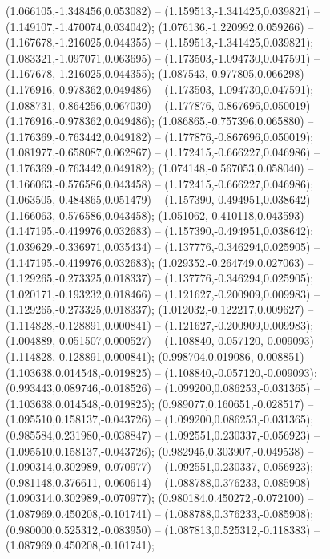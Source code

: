  (1.066105,-1.348456,0.053082) -- (1.159513,-1.341425,0.039821) -- (1.149107,-1.470074,0.034042);
 (1.076136,-1.220992,0.059266) -- (1.167678,-1.216025,0.044355) -- (1.159513,-1.341425,0.039821);
 (1.083321,-1.097071,0.063695) -- (1.173503,-1.094730,0.047591) -- (1.167678,-1.216025,0.044355);
 (1.087543,-0.977805,0.066298) -- (1.176916,-0.978362,0.049486) -- (1.173503,-1.094730,0.047591);
 (1.088731,-0.864256,0.067030) -- (1.177876,-0.867696,0.050019) -- (1.176916,-0.978362,0.049486);
 (1.086865,-0.757396,0.065880) -- (1.176369,-0.763442,0.049182) -- (1.177876,-0.867696,0.050019);
 (1.081977,-0.658087,0.062867) -- (1.172415,-0.666227,0.046986) -- (1.176369,-0.763442,0.049182);
 (1.074148,-0.567053,0.058040) -- (1.166063,-0.576586,0.043458) -- (1.172415,-0.666227,0.046986);
 (1.063505,-0.484865,0.051479) -- (1.157390,-0.494951,0.038642) -- (1.166063,-0.576586,0.043458);
 (1.051062,-0.410118,0.043593) -- (1.147195,-0.419976,0.032683) -- (1.157390,-0.494951,0.038642);
 (1.039629,-0.336971,0.035434) -- (1.137776,-0.346294,0.025905) -- (1.147195,-0.419976,0.032683);
 (1.029352,-0.264749,0.027063) -- (1.129265,-0.273325,0.018337) -- (1.137776,-0.346294,0.025905);
 (1.020171,-0.193232,0.018466) -- (1.121627,-0.200909,0.009983) -- (1.129265,-0.273325,0.018337);
 (1.012032,-0.122217,0.009627) -- (1.114828,-0.128891,0.000841) -- (1.121627,-0.200909,0.009983);
 (1.004889,-0.051507,0.000527) -- (1.108840,-0.057120,-0.009093) -- (1.114828,-0.128891,0.000841);
 (0.998704,0.019086,-0.008851) -- (1.103638,0.014548,-0.019825) -- (1.108840,-0.057120,-0.009093);
 (0.993443,0.089746,-0.018526) -- (1.099200,0.086253,-0.031365) -- (1.103638,0.014548,-0.019825);
 (0.989077,0.160651,-0.028517) -- (1.095510,0.158137,-0.043726) -- (1.099200,0.086253,-0.031365);
 (0.985584,0.231980,-0.038847) -- (1.092551,0.230337,-0.056923) -- (1.095510,0.158137,-0.043726);
 (0.982945,0.303907,-0.049538) -- (1.090314,0.302989,-0.070977) -- (1.092551,0.230337,-0.056923);
 (0.981148,0.376611,-0.060614) -- (1.088788,0.376233,-0.085908) -- (1.090314,0.302989,-0.070977);
 (0.980184,0.450272,-0.072100) -- (1.087969,0.450208,-0.101741) -- (1.088788,0.376233,-0.085908);
 (0.980000,0.525312,-0.083950) -- (1.087813,0.525312,-0.118383) -- (1.087969,0.450208,-0.101741);
